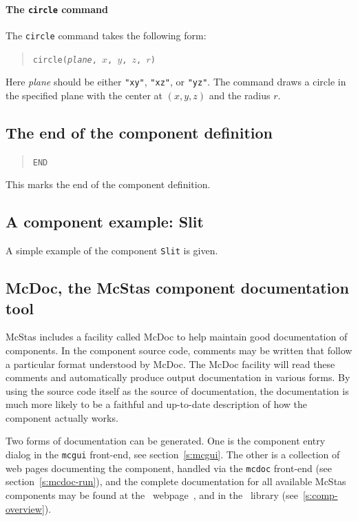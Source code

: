 \paragraph{The {\tt circle} command}

The {\tt circle} command takes the following form:
\begin{quote}
  \texttt{circle({\it plane}, $x$, $y$, $z$, $r$)}
\end{quote}
Here {\it plane} should be either \verb+"xy"+, \verb+"xz"+, or
\verb+"yz"+. The command draws a circle in the specified plane with the center
 at $(x, y, z)$ and the radius $r$.



\subsection{The end of the component definition}

\begin{quote}
  \texttt{END}
\end{quote}
This marks the end of the component definition.

\subsection{A component example: Slit}
\label{s:slit}
A simple example of the component \texttt{Slit} is given.



\subsection{McDoc, the McStas component documentation tool}
\label{s:mcdoc}

McStas includes a facility called McDoc to help
maintain good documentation of components. In the component source code,
comments may be written that follow a particular format understood by
McDoc. The McDoc facility will read these comments and automatically
produce output documentation in various forms. By using the source code
itself as the source of documentation, the documentation is much more
likely to be a faithful and up-to-date description of how the component
actually works.

Two forms of documentation can be generated. One
is the component entry dialog in the \verb+mcgui+ front-end, see
section~\ref{s:mcgui}. The other is a collection of web pages documenting
the component, handled via the \verb+mcdoc+ front-end (see section~\ref{s:mcdoc-run}), and the complete documentation for all available
McStas components may be found at the \MCS\
webpage~\cite{mcstas_webpage}, and in the \MCS\ library (see~\ref{s:comp-overview}).

